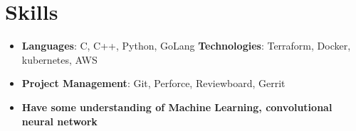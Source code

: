 \documentclass[letterpaper,11pt]{article}
\newcommand{\resumeSubHeadingListStart}{\begin{itemize}[leftmargin=*]}
\newcommand{\resumeSubHeadingListEnd}{\end{itemize}}
\begin{document}
%
\section{Skills}
 \resumeSubHeadingListStart
   \item{
     \textbf{Languages}{: C, C++, Python, GoLang}
     \hfill
     \textbf{Technologies}{: Terraform, Docker, kubernetes, AWS}
     }
     \item{
     \textbf{Project Management}{: Git, Perforce, Reviewboard, Gerrit}
    }
    \item{
     \textbf{Have some understanding of Machine Learning, convolutional neural network}
    }
 \resumeSubHeadingListEnd


\end{document}
